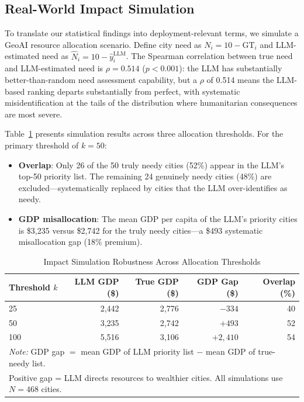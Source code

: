 \documentclass[12pt]{article}
\begin{document}
\subsection{Real-World Impact Simulation}
\label{sec:impact}

To translate our statistical findings into deployment-relevant terms, we simulate a GeoAI resource allocation scenario. Define city need as $N_i = 10 - \mathrm{GT}_i$ and LLM-estimated need as $\hat{N}_i = 10 - \hat{y}_i^{\mathrm{LLM}}$. The Spearman correlation between true need and LLM-estimated need is $\rho = 0.514$ ($p < 0.001$): the LLM has substantially better-than-random need assessment capability, but a $\rho$ of 0.514 means the LLM-based ranking departs substantially from perfect, with systematic misidentification at the tails of the distribution where humanitarian consequences are most severe.

Table~\ref{tab:impact_sim} presents simulation results across three allocation thresholds. For the primary threshold of $k = 50$:
\begin{itemize}
    \item \textbf{Overlap}: Only 26 of the 50 truly needy cities (52\%) appear in the LLM's top-50 priority list. The remaining 24 genuinely needy cities (48\%) are excluded---systematically replaced by cities that the LLM over-identifies as needy.
    \item \textbf{GDP misallocation}: The mean GDP per capita of the LLM's priority cities is \$3,235 versus \$2,742 for the truly needy cities---a \$493 systematic misallocation gap (18\% premium).
\end{itemize}

\begin{table}[htbp]
\caption{Impact Simulation Robustness Across Allocation Thresholds}
\label{tab:impact_sim}
\centering
\begin{tabular}{lrrrr}
\toprule
Threshold $k$ & LLM GDP (\$) & True GDP (\$) & GDP Gap (\$) & Overlap (\%) \\
\midrule
25  & 2,442 & 2,776 & $-334$ & 40 \\
50  & 3,235 & 2,742 & $+493$ & 52 \\
100 & 5,516 & 3,106 & $+2,410$ & 54 \\
\bottomrule
\multicolumn{5}{l}{\textit{Note:} GDP gap $= $ mean GDP of LLM priority list $-$ mean GDP of true-needy list.} \\
\multicolumn{5}{l}{Positive gap = LLM directs resources to wealthier cities. All simulations use $N = 468$ cities.} \\
\end{tabular}
\end{table}
\end{document}

